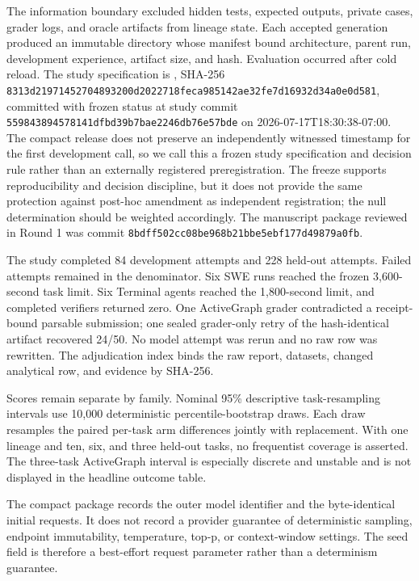 \documentclass[10pt,twocolumn]{article}
\begin{document}
The information boundary excluded hidden tests, expected outputs,
private cases, grader logs, and oracle artifacts from lineage state.
Each accepted generation produced an immutable directory whose manifest
bound architecture, parent run, development experience, artifact size,
and hash. Evaluation occurred after cold reload. The study specification
is , SHA-256
\texttt{8313d219\allowbreak{}71452704\allowbreak{}893200d2\allowbreak{}022718fe\allowbreak{}ca985142\allowbreak{}ae32fe7d\allowbreak{}16932d34\allowbreak{}a0e0d581},
committed with frozen status at study commit
\texttt{55984389\allowbreak{}4578141d\allowbreak{}fbd39b7b\allowbreak{}ae2246db\allowbreak{}76e57bde}
on 2026-07-17T18:30:38-07:00. The compact release does not preserve an
independently witnessed timestamp for the first development call, so we
call this a frozen study specification and decision rule rather than an
externally registered preregistration. The freeze supports
reproducibility and decision discipline, but it does not provide the
same protection against post-hoc amendment as independent registration;
the null determination should be weighted accordingly. The manuscript
package reviewed in Round 1 was commit
\texttt{8bdff502\allowbreak{}cc08be96\allowbreak{}8b21bbe5\allowbreak{}ebf177d4\allowbreak{}9879a0fb}.

The study completed 84 development attempts and 228 held-out attempts.
Failed attempts remained in the denominator. Six SWE runs reached the
frozen 3,600-second task limit. Six Terminal agents reached the
1,800-second limit, and completed verifiers returned zero. One
ActiveGraph grader contradicted a receipt-bound parsable submission; one
sealed grader-only retry of the hash-identical artifact recovered 24/50.
No model attempt was rerun and no raw row was rewritten. The
adjudication index binds the raw report, datasets, changed analytical
row, and evidence by SHA-256.

Scores remain separate by family. Nominal 95\% descriptive
task-resampling intervals use 10,000 deterministic percentile-bootstrap
draws. Each draw resamples the paired per-task arm differences jointly
with replacement. With one lineage and ten, six, and three held-out
tasks, no frequentist coverage is asserted. The three-task ActiveGraph
interval is especially discrete and unstable and is not displayed in the
headline outcome table.

The compact package records the outer model identifier and the
byte-identical initial requests. It does not record a provider guarantee
of deterministic sampling, endpoint immutability, temperature, top-p, or
context-window settings. The seed field is therefore a best-effort
request parameter rather than a determinism guarantee.
\end{document}
